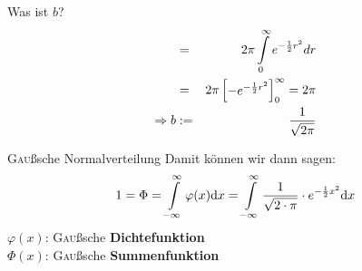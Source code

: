 \documentclass[14pt]{beamer}
\begin{document}
\begin{frame}[allowframebreaks]{Was ist $b$?}
\small
\begin{eqnarray}
&=& 2 \pi \int\displaylimits^{\infty}_{0} e^{-\frac{1}{2}r^2} dr \\
&=& 2 \pi \begin{bmatrix}-e^{-\frac{1}{2} r^2} \end{bmatrix}^\infty_0 = 2 \pi\\
\Rightarrow b&:=&\frac{1}{\sqrt{2\pi}}
\end{eqnarray}
\end{frame}


\begin{frame}{\textrm{\textsc{Gau}ß}sche Normalverteilung}
Damit können wir dann sagen:
$$
1= \Phi =  \int\displaylimits^{\infty}_{-\infty} \varphi(x) {\mathrm d}x = \int\displaylimits^{\infty}_{-\infty} \frac{1}{\sqrt{2\cdot \pi}} \cdot e^{-\frac{1}{2}x^2} {\mathrm d}x
$$
$\varphi(x)$: \textrm{\textsc{Gau}ß}sche \textbf{Dichtefunktion}\\
$\Phi(x)$:  \textrm{\textsc{Gau}ß}sche \textbf{Summenfunktion}
\end{frame}




\end{document}
